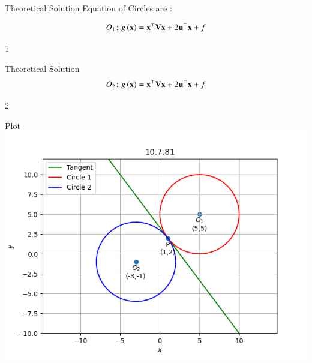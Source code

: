 \documentclass{beamer}
\begin{document}
\begin{frame}{Theoretical Solution}
Equation of Circles are : 

\begin{align}
    O_1 \colon g\left(\mathbf{x}\right) = \mathbf{x}^{\top}\mathbf{V}\mathbf{x} + 2\mathbf{u}^{\top}\mathbf{x} + f 
\end{align}

\begin{table}[H]
    \centering
    
    \caption{1}
    \label{tab:placeholder}
\end{table}
\end{frame}
\begin{frame}{Theoretical Solution}
\begin{align}
    O_2 \colon g\left(\mathbf{x}\right) = \mathbf{x}^{\top}\mathbf{V}\mathbf{x} + 2\mathbf{u}^{\top}\mathbf{x} + f 
\end{align}

\begin{table}[H]
    \centering
    
    \caption{2}
    \label{tab:placeholder}
\end{table}
\end{frame}

\begin{frame}{Plot}
    \centering
    \includegraphics[width=\columnwidth, height=0.8\textheight, keepaspectratio]{../figs/graph2.png}   
\end{frame}
\end{document}
